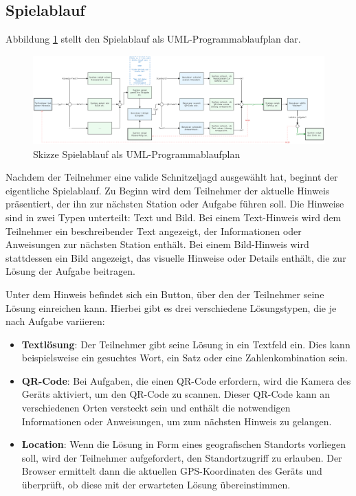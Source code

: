 \subsection{Spielablauf} \label{cha:swentwurf:spielablauf}

Abbildung \ref{fig:hunt_game_spielablauf} stellt den Spielablauf als UML-Programmablaufplan dar. 

\begin{figure}[H]
  \centering
  \includegraphics[width=\textwidth]{images/PrAr_Spielablauf.png}
  \caption{Skizze Spielablauf als UML-Programmablaufplan}
  \label{fig:hunt_game_spielablauf}
\end{figure}

Nachdem der Teilnehmer eine valide Schnitzeljagd ausgewählt hat, beginnt der eigentliche Spielablauf. Zu Beginn wird dem Teilnehmer der aktuelle Hinweis präsentiert, der ihn zur nächsten Station oder Aufgabe führen soll. Die Hinweise sind in zwei Typen unterteilt: Text und Bild. Bei einem Text-Hinweis wird dem Teilnehmer ein beschreibender Text angezeigt, der Informationen oder Anweisungen zur nächsten Station enthält. Bei einem Bild-Hinweis wird stattdessen ein Bild angezeigt, das visuelle Hinweise oder Details enthält, die zur Lösung der Aufgabe beitragen.

Unter dem Hinweis befindet sich ein Button, über den der Teilnehmer seine Lösung einreichen kann. Hierbei gibt es drei verschiedene Lösungstypen, die je nach Aufgabe variieren:
\begin{itemize}
    \item \textbf{Textlösung}: Der Teilnehmer gibt seine Lösung in ein Textfeld ein. Dies kann beispielsweise ein gesuchtes Wort, ein Satz oder eine Zahlenkombination sein.

    \item \textbf{QR-Code}: Bei Aufgaben, die einen QR-Code erfordern, wird die Kamera des Geräts aktiviert, um den QR-Code zu scannen. Dieser QR-Code kann an verschiedenen Orten versteckt sein und enthält die notwendigen Informationen oder Anweisungen, um zum nächsten Hinweis zu gelangen.

    \item \textbf{Location}: Wenn die Lösung in Form eines geografischen Standorts vorliegen soll, wird der Teilnehmer aufgefordert, den Standortzugriff zu erlauben. Der Browser ermittelt dann die aktuellen GPS-Koordinaten des Geräts und überprüft, ob diese mit der erwarteten Lösung übereinstimmen.
\end{itemize}

